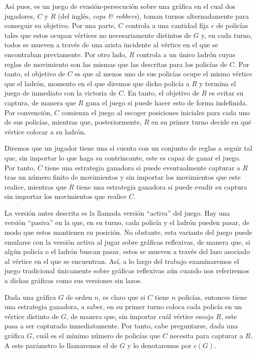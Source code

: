 As\'i pues,  es un juego de
evasi\'on-persecuci\'on sobre una gr\'afica en el cual dos jugadores, $C$ y $R$
(del ingl\'es, \textit{cops \& robbers}), toman turnos alternadamente para
conseguir su objetivo. Por una parte, $C$ controla a una cantidad fija $c$ de
polic\'ias tales que estos ocupan v\'ertices no necesariamente distintos de $G$
y, en cada turno, todos se mueven a trav\'es de una arista incidente al
v\'ertice en el que se encontraban previamente. Por otro lado, $R$ controla a un
\'unico ladr\'on cuyas reglas de movimiento son las mismas que las descritas
para los polic\'ias de $C$. Por tanto, el objetivo de $C$ es que al menos uno de
sus polic\'ias ocupe el mismo v\'ertice que el ladr\'on, momento en el que
diremos que dicho polic\'ia  a $R$ y termina el juego de
inmediato con la victoria de $C$. En tanto, el objetivo de $R$ es evitar su
captura, de manera que $R$ gana el juego si puede hacer esto de forma
indefinida. Por convenci\'on, $C$ comienza el juego al escoger posiciones
iniciales para cada uno de sus polic\'ias, mientras que, posteriormente, $R$ en
su primer turno decide en qu\'e v\'ertice colocar a su ladr\'on.

Diremos que un jugador tiene una  si cuenta con un
conjunto de reglas a seguir tal que, sin importar lo que haga su contrincante,
este es capaz de ganar el juego. Por tanto, $C$ tiene una estrategia ganadora si
puede eventualmente capturar a $R$ tras un n\'umero finito de movimientos y sin
importar los movimientos que este realice, mientras que $R$ tiene una estrategia
ganadora si puede evadir su captura sin importar los movimientos que realice
$C$.

La versi\'on antes descrita es la llamada versi\'on ``activa'' del juego.   Hay
una versi\'on ``pasiva'' en la que, en su turno, cada polic\'ia y el ladr\'on
pueden pasar, de modo que estos mantienen su posici\'on. No obstante, esta
variante del juego puede emularse con la versi\'on activa al jugar sobre
gr\'aficas reflexivas, de manera que, si alg\'un polic\'ia o el ladr\'on buscan
pasar, estos se mueven a trav\'es del lazo asociado al v\'ertice en el que se
encuentran. As\'i, a lo largo del trabajo examinaremos el juego tradicional
\'unicamente sobre gr\'aficas reflexivas a\'un cuando nos referiremos a dichas
gr\'aficas como sus versiones sin lazos.

Dada una gr\'afica $G$ de orden $n$, es claro que si $C$ tiene $n$ polic\'ias,
entonces tiene una estrategia ganadora, a saber, en su primer turno coloca cada
polic\'ia en un v\'ertice distinto de $G$, de manera que, sin importar cu\'al
v\'ertice escoja $R$, este pasa a ser capturado inmediatamente. Por tanto, cabe
preguntarse, dada una gr\'afica $G$, cu\'al es el m\'inimo n\'umero de
polic\'ias que $C$ necesita para capturar a $R$. A este par\'ametro lo
llamaremos el  de $G$ y lo denotaremos por $c(G)$.

